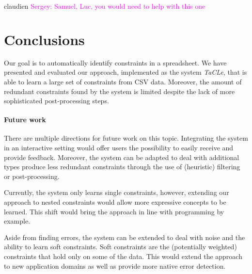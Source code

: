 \documentclass{sig-alternate-05-2015}
\newcommand{\sergey}[1]{\textcolor{magenta}{{\sc Sergey:} #1}\xspace}
\newcommand{\format}[1]{\textit{#1}\xspace}
\newcommand{\sname}{\format{TaCLe}}
\begin{document}
claudien \cite{claudien} \sergey{Samuel, Luc, you would need to help with this one}

\section{Conclusions}\label{sec:conclusions}

Our goal is to automatically identify constraints in a spreadsheet.
We have presented and evaluated our approach, implemented as the system \sname, that is able to learn a large set of constraints from CSV data.
Moreover, the amount of redundant constraints found by the system is limited despite the lack of more sophisticated post-processing steps.

\paragraph{Future work}
There are multiple directions for future work on this topic.
Integrating the system in an interactive setting would offer users the possibility to easily receive and provide feedback.
Moreover, the system can be adapted to deal with additional types produce less redundant constraints through the use of (heuristic) filtering or post-processing.

Currently, the system only learns single constraints, however, extending our approach to nested constraints would allow more expressive concepts to be learned.
This shift would bring the approach in line with programming by example.

Aside from finding errors, the system can be extended to deal with noise and the ability to learn soft constraints.
Soft constraints are the (potentially weighted) constraints that hold only on some of the data.
This would extend the approach to new application domains as well as provide more native error detection.



\end{document}

